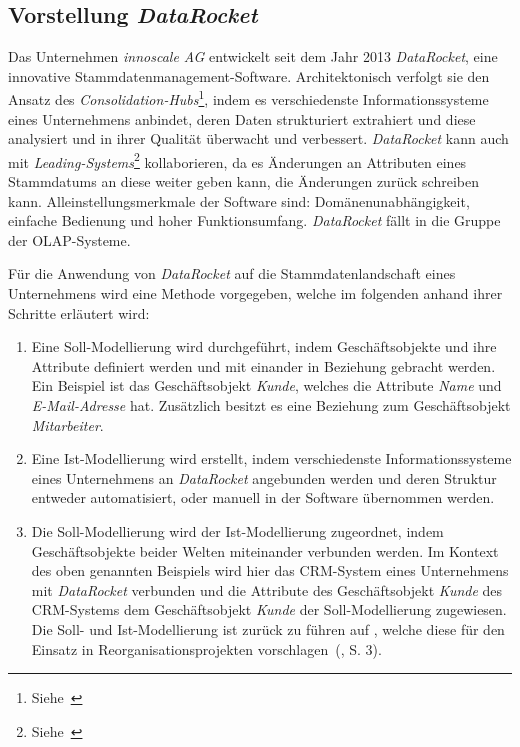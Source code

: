 \documentclass[
  language=german, %
  type=bachelor%
]{isthesis}
\begin{document}
\begin{content}
  \subsection{Vorstellung \textit{DataRocket}}\label{sec:Vorstellung-DataRocket}

	Das Unternehmen \textit{innoscale AG} entwickelt seit dem Jahr 2013
	\textit{DataRocket}, eine innovative Stammdatenmanagement-Software.
	Architektonisch verfolgt sie den Ansatz des
	\textit{Consolidation-Hubs}\footnote{Siehe~\cite{baghi2014toward}}, indem es
	verschiedenste Informationssysteme eines Unternehmens anbindet, deren Daten
	strukturiert extrahiert und diese analysiert und in ihrer Qualität überwacht
	und verbessert. \textit{DataRocket} kann auch mit
	\textit{Leading-Systems}\footnote{Siehe~\cite{baghi2014toward}}
	kollaborieren, da es Änderungen an Attributen eines Stammdatums an diese
	weiter geben kann, \bzw{} die Änderungen zurück schreiben kann.
	Alleinstellungsmerkmale der Software sind: Domänenunabhängigkeit, einfache
	Bedienung und hoher Funktionsumfang. \textit{DataRocket} fällt in die Gruppe der \acrshort{OLAP}-Systeme.

	Für die Anwendung von \textit{DataRocket} auf die Stammdatenlandschaft eines
	Unternehmens wird eine Methode vorgegeben, welche im folgenden anhand ihrer
	Schritte erläutert wird:

	\begin{enumerate}
    \item Eine Soll-Modellierung wird durchgeführt, indem Geschäftsobjekte und
      ihre Attribute definiert werden und mit einander in Beziehung gebracht
      werden. Ein Beispiel ist das Geschäftsobjekt \textit{Kunde}, welches die
      Attribute \textit{Name} und \textit{E-Mail-Adresse} hat. Zusätzlich
      besitzt es eine Beziehung zum Geschäftsobjekt \textit{Mitarbeiter}. 

    \item Eine Ist-Modellierung wird erstellt, indem verschiedenste
      Informationssysteme eines Unternehmens an \textit{DataRocket} angebunden
      werden und deren Struktur entweder automatisiert, oder manuell in der
      Software übernommen werden. 

    \item Die Soll-Modellierung wird der Ist-Modellierung zugeordnet, indem
      Geschäftsobjekte beider Welten miteinander verbunden werden. Im Kontext
      des oben genannten Beispiels wird hier das \acrshort{CRM}-System eines
      Unternehmens mit \textit{DataRocket} verbunden und die Attribute des
      Geschäftsobjekt \textit{Kunde} des \acrshort{CRM}-Systems dem
      Geschäftsobjekt \textit{Kunde} der Soll-Modellierung zugewiesen. Die
      Soll- und Ist-Modellierung ist zurück zu führen auf
      \textsc{\citeauthor{becker2006konzeptionelle}}, welche diese \zB{} für
      den Einsatz in \glqq{}Reorganisationsprojekten\grqq{}
      vorschlagen~(\citeyear{becker2006konzeptionelle}, S. 3).


\end{enumerate}
\end{content}
\end{document}
